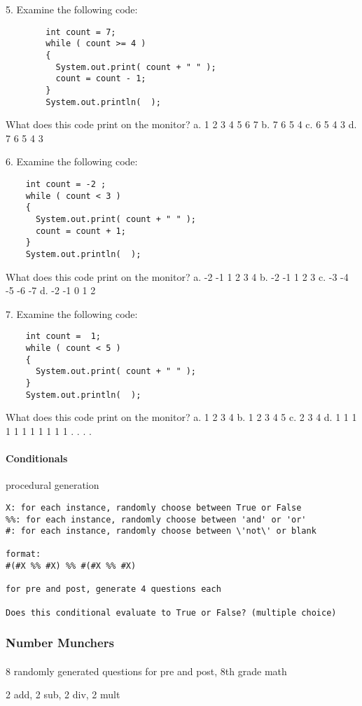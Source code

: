 5. Examine the following code:
	\begin{lstlisting}
		int count = 7;                                  
		while ( count >= 4 )  
		{
		  System.out.print( count + " " );
		  count = count - 1; 
		}
		System.out.println(  );
	\end{lstlisting}
What does this code print on the monitor?
a. 1 2 3 4 5 6 7
b. 7 6 5 4
c. 6 5 4 3
d. 7 6 5 4 3

6. Examine the following code:
\begin{lstlisting}
	int count = -2 ;                                  
	while ( count < 3 )  
	{
	  System.out.print( count + " " );
	  count = count + 1; 
	}
	System.out.println(  );
	\end{lstlisting}
What does this code print on the monitor?
a. -2 -1 1 2 3 4
b. -2 -1 1 2 3
c. -3 -4 -5 -6 -7
d. -2 -1 0 1 2

7. Examine the following code:
	\begin{lstlisting}
	int count =  1;                                  
	while ( count < 5 )  
	{
	  System.out.print( count + " " );
	}
	System.out.println(  );
	\end{lstlisting}
What does this code print on the monitor?
a. 1 2 3 4
b. 1 2 3 4 5
c. 2 3 4
d. 1 1 1 1 1 1 1 1 1 1 1 . . . .



		\paragraph{Conditionals} procedural generation

\begin{lstlisting}
X: for each instance, randomly choose between True or False
%%: for each instance, randomly choose between 'and' or 'or'
#: for each instance, randomly choose between \'not\' or blank

format:
#(#X %% #X) %% #(#X %% #X)

for pre and post, generate 4 questions each

Does this conditional evaluate to True or False? (multiple choice)

\end{lstlisting}

	\subsubsection{Number Munchers}
	\paragraph{} 8 randomly generated questions for pre and post, 8th grade math

2 add, 2 sub, 2 div, 2 mult

